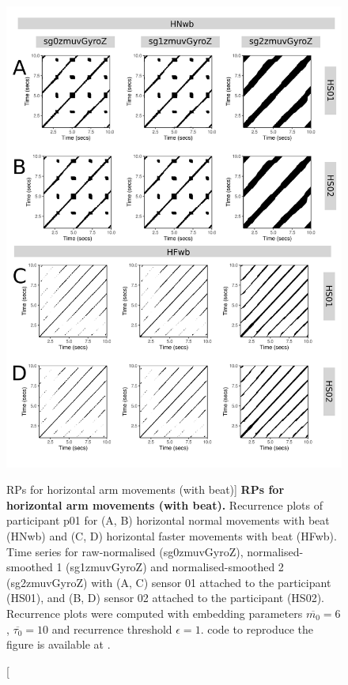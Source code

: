 \begin{figure}
\centering
\includegraphics[height=0.8\textheight]{fig_5_10}
\caption
	[RPs for horizontal arm movements (with beat)]{
	{\bf RPs for horizontal arm movements (with beat).}	
	Recurrence plots of participant p01 for 
	(A, B) horizontal normal movements with beat (HNwb) and
	(C, D) horizontal faster movements with beat (HFwb).
	Time series for raw-normalised (sg0zmuvGyroZ), 
	normalised-smoothed 1 (sg1zmuvGyroZ) and 
	normalised-smoothed 2 (sg2zmuvGyroZ) with
	(A, C) sensor 01 attached to the participant (HS01), and
	(B, D) sensor 02 attached to the participant (HS02).
	Recurrence plots were computed with 
	embedding parameters $\overline{m_0}=6$, $\overline{\tau_0}=10$ and 
	recurrence threshold $\epsilon=1$.
	\R code to reproduce the figure is available at 
	.
        }
    \label{fig:rps_Hwb_w500}
\end{figure}
